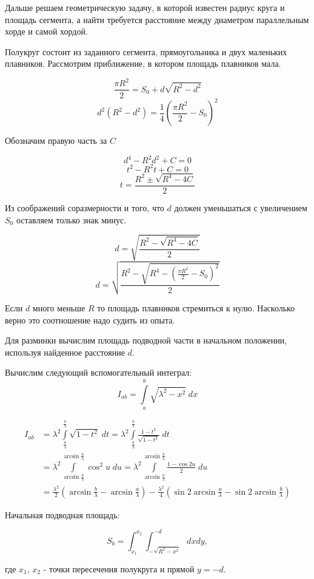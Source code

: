 \documentclass[12pt,a4paper]{article}
\newcounter{subsubsubsection}[subsubsection]
\begin{document}
Дальше решаем геометрическую задачу, в которой известен радиус круга и площадь сегмента, а найти требуется расстояние между диаметром параллельным хорде и самой хордой.

Полукруг состоит из заданного сегмента, прямоугольника и двух маленьких плавников. Рассмотрим приближение, в котором площадь плавников мала.

$$ \frac{\pi R^2}{2} = S_0 + d\sqrt{R^2-d^2} $$
$$ d^2(R^2-d^2) = \frac{1}{4}(\frac{\pi R^2}{2} - S_0)^2 $$

Обозначим правую часть за $C$

$$ d^4 - R^2d^2 + C = 0 $$
$$ t^2 - R^2t + C = 0 $$
$$ t = \frac{R^2 \pm \sqrt{R^4-4C}}{2} $$

Из соображений соразмерности и того, что $d$ должен уменьшаться с увеличением $S_0$ оставляем только знак минус.

$$ d = \sqrt{\frac{R^2 - \sqrt{R^4-4C}}{2}} $$
$$ d = \sqrt{\frac{R^2 - \sqrt{R^4-(\frac{\pi R^2}{2} - S_0)^2}}{2}} $$

Если $d$ много меньше $R$ то площадь плавников стремиться к нулю. Насколько верно это соотношение надо судить из опыта.


Для разминки вычислим площадь подводной части в начальном положении, используя найденное расстояние $d$. 

Вычислим следующий вспомогательный интеграл:
$$ I_{ab} = \int\limits_a^b \sqrt{\lambda^2 - x^2}\;dx $$

\begin{align*}
	I_{ab} &= \lambda^2 \int\limits_\frac{a}{\lambda}^\frac{b}{\lambda} \sqrt{1 - t^2}\;dt 
	= \lambda^2 \int\limits_\frac{a}{\lambda}^\frac{b}{\lambda} \frac{1 - t^2}{\sqrt{1 - t^2}}\;dt \\
	&= \lambda^2 \int\limits_{\arcsin\frac{a}{\lambda}}^{\arcsin\frac{b}{\lambda}} \cos^2u\;du 
	= \lambda^2 \int\limits_{\arcsin\frac{a}{\lambda}}^{\arcsin\frac{b}{\lambda}} \frac{1-\cos2u}{2}\;du \\
	&= \frac{\lambda^2}{2}(\arcsin\frac{b}{\lambda} - \arcsin\frac{a}{\lambda}) - \frac{\lambda^2}{4}(\sin 2\arcsin\frac{a}{\lambda} - \sin 2\arcsin\frac{b}{\lambda}) 
\end{align*}

Начальная подводная площадь:

$$ S_b = \int_{x_1}^{x_2} \int_{-\sqrt{R^2-x^2}}^{-d} dx dy, $$

где $x_1$, $x_2$ - точки пересечения полукруга и прямой $y=-d$. 
\end{document}
